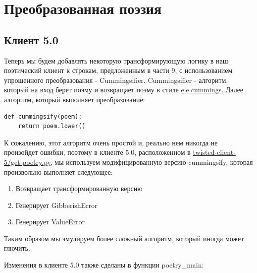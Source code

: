 
\section{Преобразованная поэзия\label{sec:part10}}

\subsection{Клиент 5.0}


Теперь мы будем добавлять некоторую трансформирующую логику в 
наш поэтический клиент к строкам, предложенным в части 9, с 
использованием упрощенного преобразования - Cummingsifier.
Cummingsifier - алгоритм, который на вход берет поэму и возвращает 
поэму в стиле \href{http://en.wikipedia.org/wiki/E.\_E.\_Cummings}{e.e.cummings}.
Далее алгоритм, который выполняет преoбразование:

\begin{scriptsize}\begin{verbatim}
def cummingsify(poem):
    return poem.lower()
\end{verbatim}\end{scriptsize} 

К сожалению, этот алгоритм очень простой и, реально нем никогда не произойдет ошибки, 
поэтому в клиенте 5.0, расположенном в 
\href{http://github.com/jdavisp3/twisted-intro/blob/master/twisted-client-5/get-poetry.py#L1}{twisted-client-5/get-poetry.py}, мы используем модифицированную версию 
cummingsify, которая произвольно выполняет следующее:

\begin{enumerate}
\item Возвращает трансформированную версию
\item Генерирует GibberishError
\item Генерирует ValueError
\end{enumerate}


Таким образом мы эмулируем более сложный алгоритм, который иногда может 
глючить.


Изменения в клиенте 5.0 также сделаны в функции poetry\_main:

